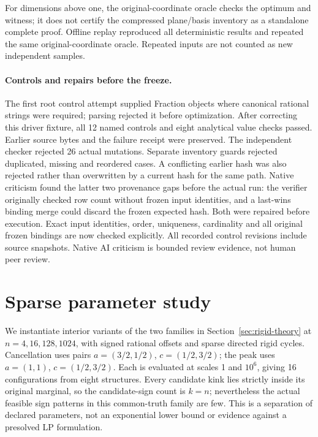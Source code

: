 For dimensions above one, the original-coordinate oracle checks the optimum
and witness; it does not certify the compressed plane/basis inventory as a
standalone complete proof. Offline replay reproduced all deterministic results
and repeated the same original-coordinate oracle. Repeated inputs are not
counted as new independent samples.

\paragraph{Controls and repairs before the freeze.}
The first root control attempt supplied Fraction objects where canonical
rational strings were required; parsing rejected it before optimization.
After correcting this driver fixture, all 12 named controls and eight analytical
value checks passed. Earlier source bytes and the failure receipt were preserved.
The independent checker rejected 26 actual mutations. Separate inventory guards
rejected duplicated, missing and reordered cases. A conflicting earlier hash
was also rejected rather than overwritten by a current hash for the same path.
Native criticism found the latter two provenance gaps before the actual run:
the verifier originally checked row count without frozen input identities,
and a last-wins binding merge could discard the frozen expected hash.
Both were repaired before execution. Exact input identities, order, uniqueness,
cardinality and all original frozen bindings are now checked explicitly.
All recorded control revisions include source snapshots. Native AI criticism
is bounded review evidence, not human peer review.

\section{Sparse parameter study}
\label{sec:benchmark}
We instantiate interior variants of the two families in Section~\ref{sec:rigid-theory}
at $n=4,16,128,1024$, with signed rational offsets and sparse directed rigid
cycles. Cancellation uses pairs $a=(3/2,1/2)$, $c=(1/2,3/2)$; the peak uses $a=(1,1)$, $c=(1/2,3/2)$. Each is evaluated at scales 1 and $10^6$, giving 16 configurations
from eight structures. Every candidate kink lies strictly inside its original
marginal, so the candidate-sign count is $k=n$; nevertheless the actual feasible
sign patterns in this common-truth family are few. This is a separation of
declared parameters, not an exponential lower bound or evidence against a
presolved LP formulation.


